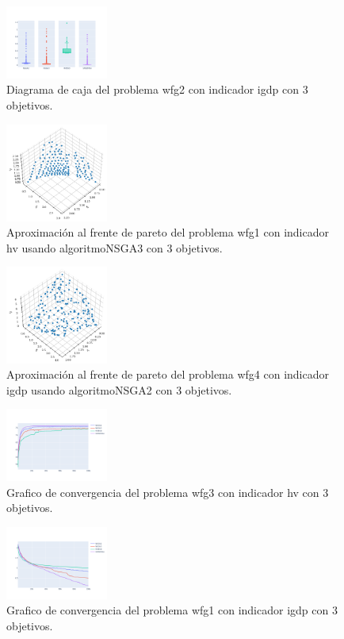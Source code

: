 \documentclass{article}
\begin{document}
\begin{figure}
	\includegraphics[width=0.3\textwidth]{wfg2_igdp_3_bp.png}
	\caption{Diagrama de caja del problema wfg2 con indicador igdp con 3 objetivos.}
\end{figure}
\clearpage
\begin{figure}
	\includegraphics[width=0.3\textwidth]{NSGA3_wfg1_hv_3_fp.png}
	\caption{Aproximación al frente de pareto del problema wfg1 con indicador hv usando algoritmoNSGA3 con 3 objetivos.}
\end{figure}
\begin{figure}
	\includegraphics[width=0.3\textwidth]{NSGA2_wfg4_igdp_3_fp.png}
	\caption{Aproximación al frente de pareto del problema wfg4 con indicador igdp usando algoritmoNSGA2 con 3 objetivos.}
\end{figure}
\begin{figure}
	\includegraphics[width=0.3\textwidth]{wfg3_hv_3_gc.png}
	\caption{Grafico de convergencia del problema wfg3 con indicador hv con 3 objetivos.}
\end{figure}
\clearpage
\begin{figure}
	\includegraphics[width=0.3\textwidth]{wfg1_igdp_3_gc.png}
	\caption{Grafico de convergencia del problema wfg1 con indicador igdp con 3 objetivos.}
\end{figure}
\end{document}
